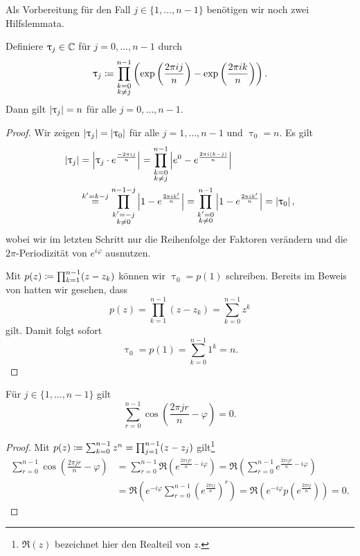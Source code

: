 Als Vorbereitung für den Fall $j \in \{1, \dots, n-1\}$ benötigen wir noch zwei
Hilfslemmata.

\begin{lemma}
    \label{lemma:uptau_j}
    Definiere $\uptau_j \in \mathbb{C}$ für $j=0, \dots, n-1$ durch
    \[
        \uptau_j \coloneqq \prod_{\substack{k=0\\k\neq j}}^{n-1} \left( \exp\left(\frac{2 \pi i j}{n}\right) - \exp\left(\frac{2 \pi i k}{n}\right) \right).
    \]
    Dann gilt $\left\lvert \uptau_j \right\rvert = n$ für alle $j = 0, \dots, n-1$.
\end{lemma}
\begin{proof}
    Wir zeigen $\left\lvert \uptau_j \right\rvert = \left\lvert \uptau_0 \right\rvert$ für alle $j = 1, \dots, n-1$ und
    $\uptau_0 = n$.
    Es gilt
    \[
        \begin{split}
            \left\lvert \uptau_j \right\rvert
            &= \left\lvert \uptau_j \cdot e^{\frac{- 2\pi i j}{n}} \right\rvert
            = \prod_{\substack{k=0\\ k\neq j}}^{n-1} \left\lvert e^0 - e^{\frac{2 \pi i (k-j)}{n}} \right\rvert\\
            &\overset{k' = k-j}{=}
            \prod_{\substack{k'=-j\\ k\neq 0}}^{n-1-j} \left\lvert 1 - e^{\frac{2 \pi i k'}{n}} \right\rvert
            = \prod_{\substack{k'=0\\ k\neq 0}}^{n-1} \left\lvert 1 - e^{\frac{2 \pi i k'}{n}} \right\rvert
            = \left\lvert \uptau_0 \right\rvert,
        \end{split}
    \]
    wobei wir im letzten Schritt nur die Reihenfolge der Faktoren verändern und
    die $2\pi$-Periodizität von $e^{i \varphi}$ ausnutzen.

    \noindent Mit $p(z) \coloneqq \prod_{k=1}^{n-1} (z - z_k)$ können wir $\uptau_0 = p(1)$
    schreiben.
    Bereits im Beweis von  hatten wir gesehen, dass
    \[
        p(z) = \prod_{k=1}^{n-1} (z-z_k) = \sum_{k=0}^{n-1} z^k
    \]
    gilt.
    Damit folgt sofort
    \[
        \uptau_0 = p(1) = \sum_{k=0}^{n-1} 1^k = n.
    \]
\end{proof}

\begin{lemma}
    \label{lemma:sum_shifted_unit_roots}
    Für $j \in \{1, \dots, n-1\}$ gilt
    \[
        \sum_{r=0}^{n-1} \cos \left( \frac{2 \pi j r}{n} - \varphi \right) = 0.
    \]
\end{lemma}
\begin{proof}
    Mit $p(z) \coloneqq \sum_{k=0}^{n-1} z^n = \prod_{j=1}^{n-1} (z - z_j)$ gilt\footnote{$\Re(z)$ bezeichnet hier den Realteil von $z$.}
    \[
        \begin{split}
            \sum_{r=0}^{n-1} \cos \left( \frac{2 \pi j r}{n} - \varphi \right)
            &= \sum_{r=0}^{n-1} \Re\left( e^{\frac{2 \pi i j r}{n} - i \varphi} \right)
            = \Re \left( \sum_{r=0}^{n-1} e^{\frac{2 \pi i j r}{n} - i \varphi} \right)\\
            &= \Re \left( e^{-i \varphi}\sum_{r=0}^{n-1} \left( e^{\frac{2 \pi i j}{n}}\right)^r \right)
            = \Re \left( e^{-i \varphi} p\left( e^{\frac{2 \pi i j}{n}} \right) \right)
            = 0.
        \end{split}
    \]
\end{proof}

